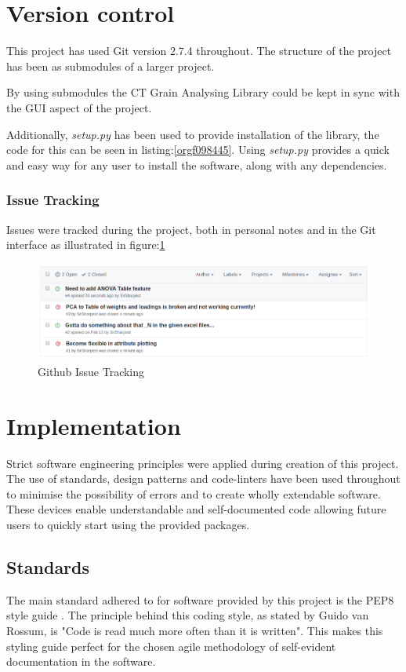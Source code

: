 \documentclass[11pt]{report}
\begin{document}
\section{Version control}
\label{sec:orge1457ef}
This project has used Git version 2.7.4 throughout. The structure of the project has been as submodules of a larger project.

By using submodules the CT Grain Analysing Library could be kept in sync with the GUI aspect of the project.

Additionally, \emph{setup.py} has been used to provide installation of the library, the code for this can be seen in listing:\ref{orgf098445}. Using \emph{setup.py} provides a quick and easy way for any user to install the software, along with any dependencies.

\subsubsection{Issue Tracking}
\label{sec:orgbae9fbb}
Issues were tracked during the project, both in personal notes and in the Git interface as illustrated in figure:\ref{fig:org7bf87d3}
\begin{figure}[htbp]
\centering
\includegraphics[width=12cm]{./images/github.png}
\caption{\label{fig:org7bf87d3}
Github Issue Tracking}
\end{figure}

\section{Implementation}
\label{sec:org47c2f5c}
Strict software engineering principles were applied during creation of this project. The use of standards, design patterns and code-linters have been used throughout to minimise the possibility of errors and to create wholly extendable software. These devices enable understandable and self-documented code allowing future users to quickly start using the provided packages.
\subsection{Standards}
\label{sec:org86f658d}
The main standard adhered to for software provided by this project is the PEP8 style guide \cite{VanRossum}. The principle behind this coding style, as stated by Guido van Rossum, is "Code is read much more often than it is written". This makes this styling guide perfect for the chosen agile methodology of self-evident documentation in the software.
\end{document}
